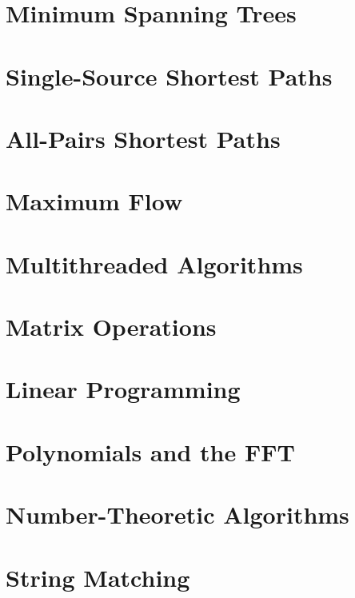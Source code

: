 \documentclass{book}
\begin{document}
\chapter{Minimum Spanning Trees}

\chapter{Single-Source Shortest Paths}

\chapter{All-Pairs Shortest Paths}

\chapter{Maximum Flow}

\chapter{Multithreaded Algorithms}

\chapter{Matrix Operations}

\chapter{Linear Programming}

\chapter{Polynomials and the FFT}

\chapter{Number-Theoretic Algorithms}

\chapter{String Matching}
\end{document}
